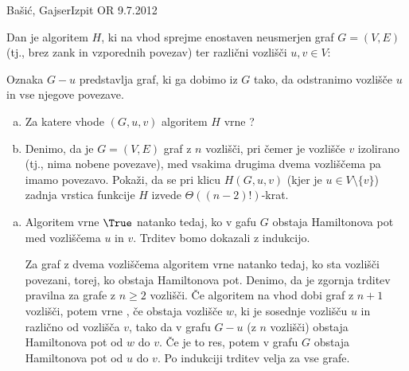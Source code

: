 \begin{naloga}{Bašić, Gajser}{Izpit OR 9.7.2012}
\begin{vprasanje}
Dan je algoritem $H$,
ki na vhod sprejme enostaven neusmerjen graf $G = (V, E)$
(tj., brez zank in vzporednih povezav)
ter različni vozlišči $u, v \in V$:
\begin{small}
\begin{algorithmic}
        \State \Return \True
    \EndIf
            \State \Return \True
        \EndIf
    \EndFor
    \State \Return \False
\EndFunction
\end{algorithmic}
\end{small}
Oznaka $G - u$ predstavlja graf,
ki ga dobimo iz $G$ tako, da odstranimo vozlišče $u$ in vse njegove povezave.

\begin{enumerate}[(a)]
\item Za katere vhode $(G, u, v)$ algoritem $H$ vrne \True?

\item Denimo, da je $G = (V, E)$ graf z $n$ vozlišči,
pri čemer je vozlišče $v$ izolirano (tj., nima nobene povezave),
med vsakima drugima dvema vozliščema pa imamo povezavo.
Pokaži, da se pri klicu $H(G, u, v)$ (kjer je $u \in V \setminus \{v\}$)
zadnja vrstica funkcije $H$ izvede $\Theta((n-2)!)$-krat.
\end{enumerate}
\end{vprasanje}

\begin{odgovor}
\begin{enumerate}[(a)]
\item Algoritem vrne $\True$ natanko tedaj,
ko v gafu $G$ obstaja Hamiltonova pot med vozliščema $u$ in $v$.
Trditev bomo dokazali z indukcijo.

Za graf z dvema vozliščema algoritem vrne \True natanko tedaj,
ko sta vozlišči povezani,
torej, ko obstaja Hamiltonova pot.
Denimo, da je zgornja trditev pravilna za grafe z $n \ge 2$ vozlišči.
Če algoritem na vhod dobi graf z $n+1$ vozlišči, potem vrne \True,
če obstaja vozlišče $w$,
ki je sosednje vozlišču $u$ in različno od vozlišča $v$,
tako da v grafu $G - u$ (z $n$ vozlišči)
obstaja Hamiltonova pot od $w$ do $v$.
Če je to res, potem v grafu $G$ obstaja Hamiltonova pot od $u$ do $v$.
Po indukciji trditev velja za vse grafe.


\end{enumerate}
\end{odgovor}
\end{naloga}
